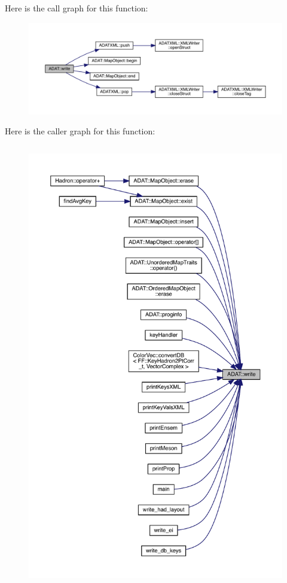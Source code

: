 Here is the call graph for this function\+:\nopagebreak
\begin{figure}[H]
\begin{center}
\leavevmode
\includegraphics[width=350pt]{d5/d0d/namespaceADAT_a38920c20e5e4ccb234f9a05e436a4faa_cgraph}
\end{center}
\end{figure}
Here is the caller graph for this function\+:
\nopagebreak
\begin{figure}[H]
\begin{center}
\leavevmode
\includegraphics[height=550pt]{d5/d0d/namespaceADAT_a38920c20e5e4ccb234f9a05e436a4faa_icgraph}
\end{center}
\end{figure}
